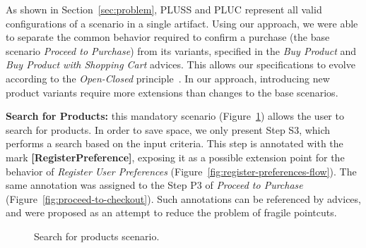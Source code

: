 \documentclass{acm_proc_article-sp}
\begin{document}
As shown in Section~\ref{sec:problem}, PLUSS and PLUC represent all valid
configurations of a scenario in a single artifact. Using our approach, we were
able to separate the common behavior required to confirm a purchase (the base
scenario \emph{Proceed to Purchase}) from its variants, specified in the
\emph{Buy Product} and \emph{Buy Product with Shopping Cart} advices. This allows
our specifications to evolve according to the \emph{Open-Closed}
principle~\cite{Meyer:2000aa}. In our approach, introducing new product variants
require more extensions than changes to the base scenarios.

{\bf Search for
Products:} this mandatory scenario (Figure~\ref{fig:search-products-flow}) allows
the user to search for products. In order to save space, we only present Step S3,
which performs a search based on the input criteria. This step is annotated with
the mark \mbox{{\bf [RegisterPreference]}}, exposing it as a possible extension
point for the behavior of \emph{Register User Preferences}
(Figure~\ref{fig:register-preferences-flow}). The same annotation was assigned to
the Step P3 of \emph{Proceed to Purchase} (Figure~\ref{fig:proceed-to-checkout}).
Such annotations can be referenced by advices, and were proposed as an attempt to
reduce the problem of fragile pointcuts.

%

\begin{figure}[ht]
\caption{Search for products scenario.}
\label{fig:search-products-flow}
\end{figure}
\end{document}
